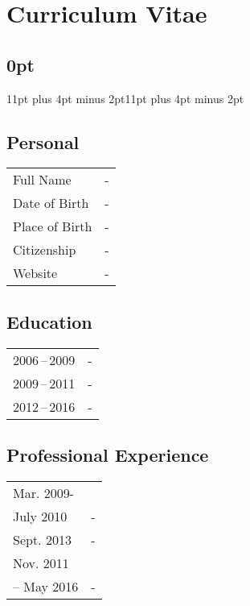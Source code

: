 \chapter{Curriculum Vitae}
\titlespacing\section{0pt}{11pt plus 4pt minus 2pt}{11pt plus 4pt minus 2pt}
\section*{Personal}
\begin{tabular}{F!{\VRule}W}
Full Name & -\\[5pt]
Date of Birth & -\\[5pt]
Place of Birth & -\\[5pt]
Citizenship & -\\[5pt]
Website & -
\end{tabular}

\section*{Education}
\begin{tabular}{F!{\VRule}W}
2006\,--\,2009&-\\[5pt]
2009\,--\,2011&-\\[5pt]
2012\,--\,2016&-
\end{tabular}

\section*{Professional Experience}
\begin{tabular}{F!{\VRule}W}
Mar. 2009-\\[5pt]
July 2010&-\\[5pt]
Sept. 2013&-\\[5pt]
Nov. 2011\\-- May 2016&-
\end{tabular}